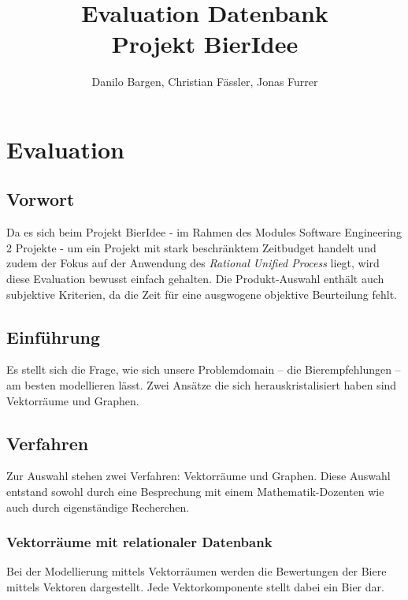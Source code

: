 \documentclass[10pt,a4paper]{scrartcl}
\author{Danilo Bargen, Christian Fässler, Jonas Furrer}
\title{Evaluation Datenbank\\Projekt BierIdee}
\begin{document}
\begin{titlepage}
	\maketitle
	\vspace{120mm}
	\thispagestyle{empty} %
\end{titlepage}

\section{Evaluation}

\subsection{Vorwort}

Da es sich beim Projekt BierIdee - im Rahmen des Modules Software Engineering 2 Projekte - um ein
Projekt mit stark beschränktem Zeitbudget handelt und zudem der Fokus auf der Anwendung des
\textit{Rational Unified Process} liegt, wird diese Evaluation bewusst einfach gehalten. Die
Produkt-Auswahl enthält auch subjektive Kriterien, da die Zeit für eine ausgwogene objektive
Beurteilung fehlt.

\subsection{Einführung}

Es stellt sich die Frage, wie sich unsere Problemdomain -- die Bierempfehlungen -- am besten
modellieren lässt. Zwei Ansätze die sich herauskristalisiert haben sind Vektorräume und Graphen.

\subsection{Verfahren}

Zur Auswahl stehen zwei Verfahren: Vektorräume und Graphen. Diese Auswahl entstand
sowohl durch eine Besprechung mit einem Mathematik-Dozenten wie auch durch
eigenständige Recherchen.

\subsubsection{Vektorräume mit relationaler Datenbank}

Bei der Modellierung mittels Vektorräumen werden die Bewertungen der Biere mittels Vektoren
dargestellt. Jede Vektorkomponente stellt dabei ein Bier dar.
\end{document}
